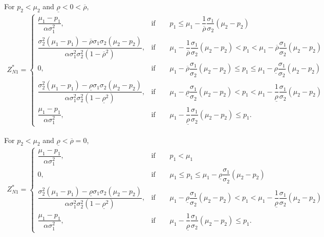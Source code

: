 \documentclass[10pt]{article}
\begin{document}
For $ p_2 < \mu_2 $ and $ \underline{\rho} < 0 < \overline{\rho} $,
{\footnotesize \begin{eqnarray}
Z_{N 1}^* = \left\{ \begin{matrix}
\dfrac{\mu_1 - p_1}{\alpha \sigma_1^2}, & \text{if} \qquad p_1 \leqslant \mu_1 - \dfrac1{\overline{\rho}} \dfrac{\sigma_1}{\sigma_2} (\mu_2 - p_2) \\
\dfrac{\sigma_2^2 (\mu_1 - p_1) - \overline{\rho} \sigma_1 \sigma_2 (\mu_2 - p_2)}{\alpha \sigma_1^2 \sigma_2^2 (1 - \overline{\rho}^2)}, & \text{if} \qquad \mu_1 - \dfrac1{\overline{\rho}} \dfrac{\sigma_1}{\sigma_2} (\mu_2 - p_2) < p_1 < \mu_1 - \overline{\rho} \dfrac{\sigma_1}{\sigma_2} (\mu_2 - p_2) \\
0, & \text{if} \qquad \mu_1 - \overline{\rho} \dfrac{\sigma_1}{\sigma_2} (\mu_2 - p_2) \leqslant p_1 \leqslant \mu_1 - \underline{\rho} \dfrac{\sigma_1}{\sigma_2} (\mu_2 - p_2) \\
\dfrac{\sigma_2^2 (\mu_1 - p_1) - \underline{\rho} \sigma_1 \sigma_2 (\mu_2 - p_2)}{\alpha \sigma_1^2 \sigma_2^2 (1 - \underline{\rho}^2)}, & \text{if} \qquad \mu_1 - \underline{\rho} \dfrac{\sigma_1}{\sigma_2} (\mu_2 - p_2) < p_1 < \mu_1 - \dfrac1{\underline{\rho}} \dfrac{\sigma_1}{\sigma_2} (\mu_2 - p_2) \\
\dfrac{\mu_1 - p_1}{\alpha \sigma_1^2}, & \text{if} \qquad \mu_1 - \dfrac1{\underline{\rho}} \dfrac{\sigma_1}{\sigma_2} (\mu_2 - p_2) \leqslant p_1.
\end{matrix} \right.
\end{eqnarray}}

For $ p_2 < \mu_2 $ and $ \underline{\rho} < \overline{\rho} = 0 $,
{\footnotesize \begin{eqnarray}
Z_{N 1}^* = \left\{ \begin{matrix}
\dfrac{\mu_1 - p_1}{\alpha \sigma_1^2}, & \text{if} \qquad p_1 < \mu_1 \\
0, & \text{if} \qquad \mu_1 \leqslant p_1 \leqslant \mu_1 - \underline{\rho} \dfrac{\sigma_1}{\sigma_2} (\mu_2 - p_2) \\
\dfrac{\sigma_2^2 (\mu_1 - p_1) - \underline{\rho} \sigma_1 \sigma_2 (\mu_2 - p_2)}{\alpha \sigma_1^2 \sigma_2^2 (1 - \underline{\rho}^2)}, & \text{if} \qquad \mu_1 - \underline{\rho} \dfrac{\sigma_1}{\sigma_2} (\mu_2 - p_2) < p_1 < \mu_1 - \dfrac1{\underline{\rho}} \dfrac{\sigma_1}{\sigma_2} (\mu_2 - p_2) \\
\dfrac{\mu_1 - p_1}{\alpha \sigma_1^2}, & \text{if} \qquad \mu_1 - \dfrac1{\underline{\rho}} \dfrac{\sigma_1}{\sigma_2} (\mu_2 - p_2) \leqslant p_1.
\end{matrix} \right.
\end{eqnarray}}
\end{document}
